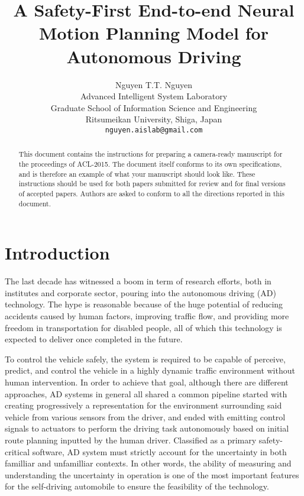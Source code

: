 \documentclass[11pt]{article}
\title{A Safety-First End-to-end Neural Motion Planning Model for Autonomous Driving}
\author{Nguyen T.T. Nguyen \\
  Advanced Intelligent System Laboratory \\
  Graduate School of Information Science and Engineering \\
  Ritsumeikan University, Shiga, Japan \\
  {\tt nguyen.aislab@gmail.com}\\}
\date{}
\begin{document}
\maketitle
\begin{abstract}
  This document contains the instructions for preparing a camera-ready
  manuscript for the proceedings of ACL-2015. The document itself
  conforms to its own specifications, and is therefore an example of
  what your manuscript should look like. These instructions should be
  used for both papers submitted for review and for final versions of
  accepted papers.  Authors are asked to conform to all the directions
  reported in this document.
\end{abstract}

\section{Introduction}

The last decade has witnessed a boom in term of research efforts, both in
institutes and corporate sector, pouring into the autonomous driving (AD) technology.
The hype is reasonable because of the huge potential of reducing accidents caused
by human factors, improving traffic flow, and providing more freedom in transportation for
disabled people, all of which this technology is expected to deliver once completed
in the future.

To control the vehicle safely, the system is required to be capable of perceive, predict,
and control the vehicle  in a highly dynamic traffic environment without human intervention.
In order to achieve that goal, although there are different approaches, AD systems in general
all shared a common pipeline started with creating progressively a representation for the
environment surrounding said vehicle from various sensors from the driver, and ended with
emitting control signals to actuators to perform the driving task autonomously based on initial
route planning inputted by the human driver. Classified as a primary safety-critical software,
AD system must strictly account for the uncertainty in both familliar and unfamilliar contexts.
In other words, the ability of measuring and understanding the uncertainty in operation is one
of the most important features for the self-driving automobile to ensure the feasibility of the
technology.
\end{document}
